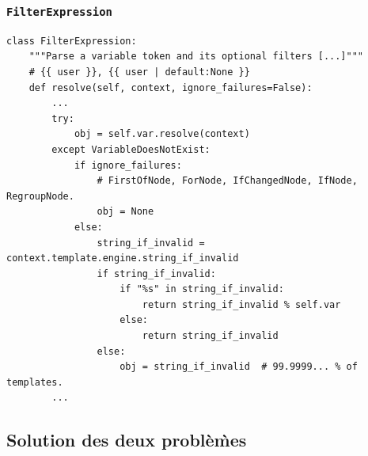 \documentclass{beamer}
\begin{document}
\begin{frame}[fragile]
    \frametitle{\texttt{FilterExpression}}

    \begin{verbatim}
class FilterExpression:
    """Parse a variable token and its optional filters [...]"""
    # {{ user }}, {{ user | default:None }}
    def resolve(self, context, ignore_failures=False):
        ...
        try:
            obj = self.var.resolve(context)
        except VariableDoesNotExist:
            if ignore_failures:
                # FirstOfNode, ForNode, IfChangedNode, IfNode, RegroupNode.
                obj = None
            else:
                string_if_invalid = context.template.engine.string_if_invalid
                if string_if_invalid:
                    if "%s" in string_if_invalid:
                        return string_if_invalid % self.var
                    else:
                        return string_if_invalid
                else:
                    obj = string_if_invalid  # 99.9999... % of templates.
        ...
    \end{verbatim}
\end{frame}

\subsection*{Solution des deux problèm̀es}
\end{document}
